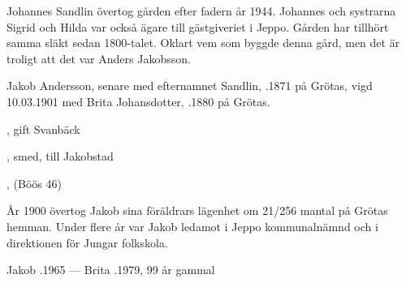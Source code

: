 Johannes Sandlin övertog gården efter fadern år 1944. Johannes och systrarna Sigrid och Hilda var också ägare till gästgiveriet i Jeppo. Gården har tillhört samma släkt sedan 1800-talet. Oklart vem som byggde denna gård, men det är troligt att det var Anders Jakobsson.


Jakob Andersson, senare med efternamnet Sandlin, .1871 på Grötas, vigd 10.03.1901 med Brita Johansdotter, .1880 på Grötas.
\begin{jhchildren}
  \item {}
  \item {}
  \item {}, gift Svanbäck
  \item {}
  \item {}
  \item {}, smed, till Jakobstad
  \item {}, (Böös 46)
  \item {}
  \item {}
  \item {}
\end{jhchildren}

År 1900 övertog Jakob sina föräldrars lägenhet om  21/256 mantal på Grötas hemman. Under flere år var Jakob ledamot i Jeppo kommunalnämnd och i direktionen för Jungar folkskola.

Jakob .1965  ---  Brita .1979, 99 år gammal


